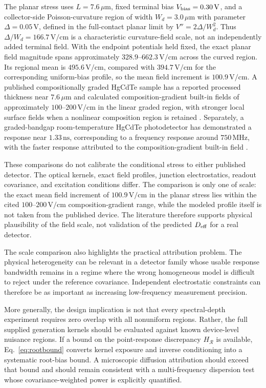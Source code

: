 \documentclass[aps,pra,twocolumn,superscriptaddress,nofootinbib]{revtex4-2}
\newcommand{\Rregion}{\mathcal{R}}
\begin{document}
The planar stress uses $L=7.6\,\mu\mathrm{m}$, fixed terminal bias $V_{\rm bias}=0.30\,\mathrm{V}$, and a collector-side Poisson-curvature region of width $W_d=3.0\,\mu\mathrm{m}$ with parameter $\Delta=0.05\,\mathrm{V}$, defined in the full-contact planar limit by $V''=2\Delta/W_d^2$.  Thus $\Delta/W_d=166.7\,\mathrm{V/cm}$ is a characteristic curvature-field scale, not an independently added terminal field.  With the endpoint potentials held fixed, the exact planar field magnitude spans approximately $328.9$--$662.3\,\mathrm{V/cm}$ across the curved region.  Its regional mean is $495.6\,\mathrm{V/cm}$, compared with $394.7\,\mathrm{V/cm}$ for the corresponding uniform-bias profile, so the mean field increment is $100.9\,\mathrm{V/cm}$. A published compositionally graded HgCdTe sample has a reported processed thickness near $7.6\,\mu\mathrm{m}$ and calculated composition-gradient built-in fields of approximately $100$--$200\,\mathrm{V/cm}$ in the linear graded region, with stronger local surface fields when a nonlinear composition region is retained \cite{xu2023graded}. Separately, a graded-bandgap room-temperature HgCdTe photodetector has demonstrated a response near $1.33\,\mathrm{ns}$, corresponding to a frequency response around $750\,\mathrm{MHz}$, with the faster response attributed to the composition-gradient built-in field \cite{sang2022graded}.

These comparisons do not calibrate the conditional stress to either published detector. The optical kernels, exact field profiles, junction electrostatics, readout covariance, and excitation conditions differ.  The comparison is only one of scale: the exact mean field increment of $100.9\,\mathrm{V/cm}$ in the planar stress lies within the cited $100$--$200\,\mathrm{V/cm}$ composition-gradient range, while the modeled profile itself is not taken from the published device.  The literature therefore supports physical plausibility of the field scale, not validation of the predicted $D_{\rm eff}$ for a real detector.

The scale comparison also highlights the practical attribution problem. The physical heterogeneity can be relevant in a detector family whose usable response bandwidth remains in a regime where the wrong homogeneous model is difficult to reject under the reference covariance. Independent electrostatic constraints can therefore be as important as increasing low-frequency measurement precision.

More generally, the design implication is not that every spectral-depth experiment requires zero overlap with all nonuniform regions. Rather, the full supplied generation kernels should be evaluated against known device-level nuisance regions. If a bound on the point-response discrepancy $H_{\Rregion}$ is available, Eq.~\eqref{eq:rootbound} converts kernel exposure and inverse conditioning into a systematic root-bias bound. A microscopic diffusion attribution should exceed that bound and should remain consistent with a multi-frequency dispersion test whose covariance-weighted power is explicitly quantified.
\end{document}

